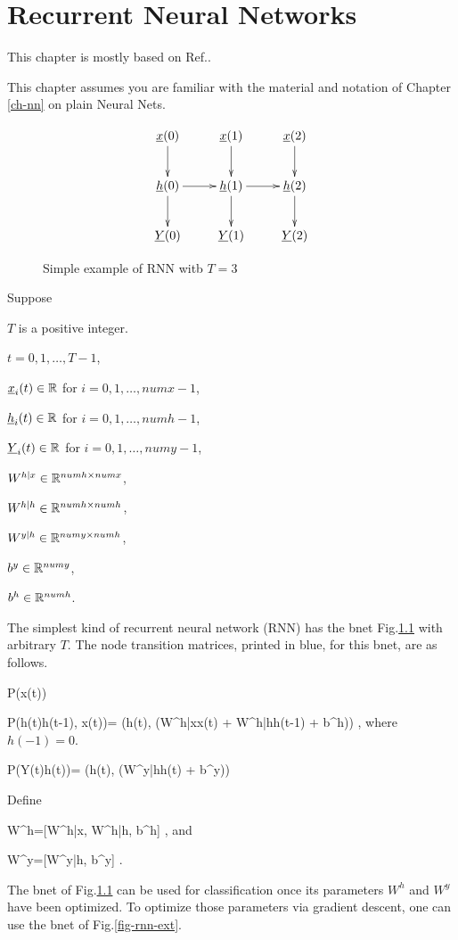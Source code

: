 \chapter{Recurrent Neural Networks}

This chapter is mostly
based on Ref.\cite{ng-rnn}.

This chapter
assumes you are
familiar 
with the material
and notation of Chapter \ref{ch-nn}
on plain Neural Nets.


\begin{figure}[h!]
\centering
$$\xymatrix{
\rvx(0)\ar[d]&
\rvx(1)\ar[d]&
\rvx(2)\ar[d]\\
\rvh(0)\ar[d]\ar[r]&
\rvh(1)\ar[d]\ar[r]&
\rvh(2)\ar[d]\\
\rvY(0)&
\rvY(1)&
\rvY(2)
}$$
\caption{Simple example of 
RNN witb $T=3$}
\label{fig-rnn}
\end{figure}

Suppose

$T$ is a positive integer.

$t=0, 1, \ldots, T-1$,

${\underline{x}}_i(t)\in { \mathbb{R}}$ for
 $i=0,1, \ldots,numx-1$,

${\underline{h}}_i(t)\in { \mathbb{R}}$ for
 $i=0,1, \ldots,numh-1$,

${\underline{Y}}_i(t)\in { \mathbb{R}}$ for
 $i=0,1, \ldots,numy-1$,

$W^{h|x}\in{ \mathbb{R}}^{numh\times numx}$,

$W^{h|h}\in{ \mathbb{R}}^{numh\times numh}$,

$W^{y|h}\in{ \mathbb{R}}^{numy\times numh}$,

$b^y\in { \mathbb{R}}^{numy}$,

$b^h\in { \mathbb{R}}^{numh}$.

The simplest kind of
recurrent neural network (RNN)
has
the bnet Fig.\ref{fig-rnn}
with arbitrary $T$.
The node
transition matrices, printed in
blue, for this bnet, are as follows.

\beq\color{blue}
P(x(t))
\eeq

\beq\color{blue}
P(h(t)\cond h(t-1), x(t))=
\delta(h(t),
\cala(W^{h|x}x(t) +
 W^{h|h}h(t-1) + b^h))
\;,
\eeq
where
$h(-1)=0$.

\beq\color{blue}
P(Y(t)\cond h(t))=
\delta(h(t),
\cala(W^{y|h}h(t) + b^y))
\eeq

Define

\beq
W^h=[W^{h|x}, W^{h|h}, b^h]
\;,
\eeq
and

\beq
W^y=[W^{y|h}, b^y]
\;.
\eeq

The bnet of Fig.\ref{fig-rnn}
can be used for
classification once 
its parameters 
$W^h$ and $W^y$
have been optimized.
To optimize
those parameters via gradient
descent,
one can use the bnet 
of Fig.\ref{fig-rnn-ext}.

